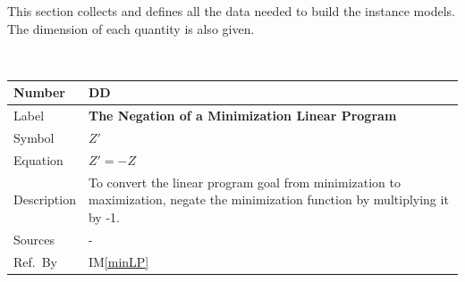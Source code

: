 \documentclass[12pt]{article}
\newcommand{\colAwidth}{0.13\textwidth}
\newcommand{\colBwidth}{0.82\textwidth}
\newcounter{defnum} %
\newcounter{datadefnum} %
\newcommand{\iref}[1]{IM\ref{#1}}
\begin{document}
This section collects and defines all the data needed to build the instance
models. The dimension of each quantity is also given.  
	
~\newline

\noindent
\begin{minipage}{\textwidth}
	\renewcommand*{\arraystretch}{1.5}
	\begin{tabular}{| p{\colAwidth} | p{\colBwidth}|}
		\hline
		\rowcolor[gray]{0.9}
		Number& DD{datadefnum}\thedatadefnum 
		\label{minToMax}\\
		\hline
		Label& \bf The Negation of a Minimization Linear Program\\
		\hline
		Symbol & $Z'$\\
		\hline
		Equation& $Z' = -Z$\\
		\hline
		Description & 
		To convert the linear program goal from minimization to maximization, 
		negate the minimization function by multiplying it by -1.
		\\
		\hline
		Sources& -\\
		\hline
		Ref.\ By & \iref{minLP}\\
		\hline
	\end{tabular}
\end{minipage}\\


~\newline
\end{document}
